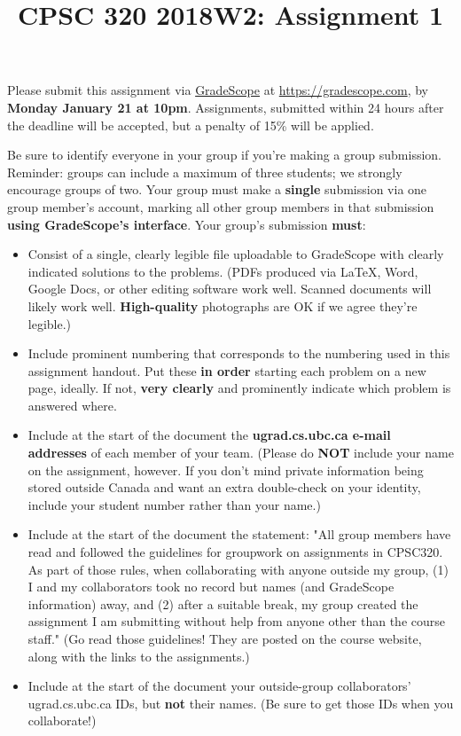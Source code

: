 \documentclass[11pt]{article}
\date{}
\title{CPSC 320 2018W2: Assignment 1}
\begin{document}
\maketitle
Please submit this assignment via \href{https://gradescope.com/}{GradeScope} at
\url{https://gradescope.com}, 
by \textbf{Monday January 21 at 10pm}. Assignments,
submitted within 24 hours after the deadline will be accepted, but a penalty
of 15\% will be applied.

Be sure to identify everyone in your group if
you're making a group submission. Reminder: groups can include a
maximum of three students; we strongly encourage groups of two.
Your group must make a \textbf{single} submission via one group member's account,
marking all other group members in that submission \textbf{using GradeScope's
interface}. Your group's submission \textbf{must}:
\begin{itemize}
\item Consist of a single, clearly legible file uploadable to GradeScope
with clearly indicated solutions to the problems. (PDFs produced via
\LaTeX{}, Word, Google Docs, or other editing software work
well. Scanned documents will likely work well. \textbf{High-quality}
photographs are OK if we agree they're legible.)
\item Include prominent numbering that corresponds to the numbering used
in this assignment handout. Put
these \textbf{in order} starting each problem on a new page, ideally. If
not, \textbf{very clearly} and prominently indicate which problem is
answered where.
\item Include at the start of the document the \textbf{ugrad.cs.ubc.ca e-mail
addresses} of each member of your team. (Please do \textbf{NOT} include
your name on the assignment, however. If you don't mind private
information being stored outside Canada and want an extra
double-check on your identity, include your student number rather
than your name.)
\item Include at the start of the document the statement: "All group
members have read and followed the guidelines for groupwork
on assignments in CPSC320. 
As part of those rules, when collaborating with anyone
outside my group, (1) I and my collaborators took no record but
names (and GradeScope information) away, and (2) after a suitable
break, my group created the assignment I am submitting without help
from anyone other than the course staff." (Go read those
guidelines! They are posted on the
course website, along with the links to the assignments.)

\item Include at the start of the document your outside-group
collaborators' ugrad.cs.ubc.ca IDs, but \textbf{not} their names. (Be sure
to get those IDs when you collaborate!)
\end{itemize}
\end{document}

